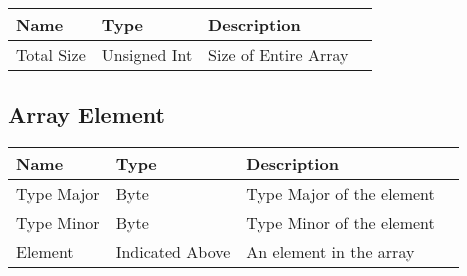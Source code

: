 \documentclass[11pt]{article}
\begin{document}
\begin{center}
\begin{tabular}{ |l|l|l|l| } 
\hline
\textbf{Name} & \textbf{Type} & \textbf{Description}\\
\hline
Total Size & Unsigned Int & Size of Entire Array\\  
\hline
\end{tabular}
\end{center}

\subsection{Array Element}

\begin{center}
\begin{tabular}{ |l|l|l|l| } 
\hline
\textbf{Name} & \textbf{Type} & \textbf{Description}\\
\hline
Type Major & Byte & Type Major of the element\\  
Type Minor & Byte & Type Minor of the element\\
Element & Indicated Above & An element in the array\\
\hline
\end{tabular}
\end{center}
\end{document}
